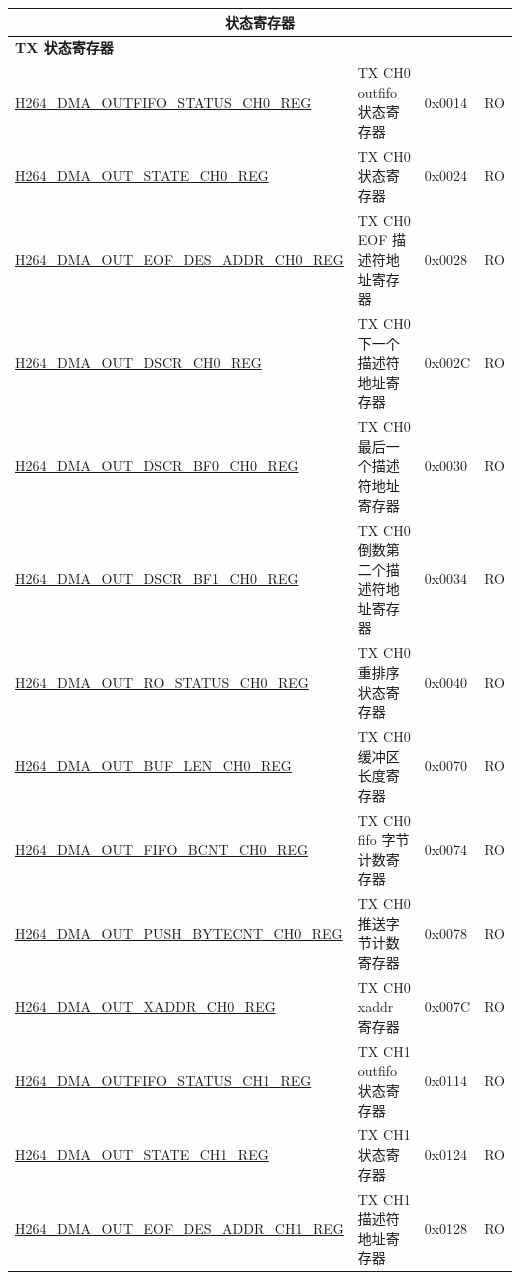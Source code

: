 \begin{longtable}{ | p{7.5cm} | p{5.7cm} | p{1.2cm} | p{1cm} | }
\multicolumn{4}{|c|}{\cellcolor{gray!15}\textbf{状态寄存器}} \\ \hline
\multicolumn{4}{|l|}{\textbf{TX 状态寄存器}} \\ \hline
    \hyperref[regdesc:H264DMAOUTFIFOSTATUSCH0REG]{H264\_DMA\_OUTFIFO\_STATUS\_CH0\_REG} & TX CH0 outfifo 状态寄存器 & 0x0014 & RO \\ \hline
    \hyperref[regdesc:H264DMAOUTSTATECH0REG]{H264\_DMA\_OUT\_STATE\_CH0\_REG} & TX CH0 状态寄存器 & 0x0024 & RO \\ \hline
    \hyperref[regdesc:H264DMAOUTEOFDESADDRCH0REG]{H264\_DMA\_OUT\_EOF\_DES\_ADDR\_CH0\_REG} & TX CH0 EOF 描述符地址寄存器 & 0x0028 & RO \\ \hline
    \hyperref[regdesc:H264DMAOUTDSCRCH0REG]{H264\_DMA\_OUT\_DSCR\_CH0\_REG} & TX CH0 下一个描述符地址寄存器 & 0x002C & RO \\ \hline
    \hyperref[regdesc:H264DMAOUTDSCRBF0CH0REG]{H264\_DMA\_OUT\_DSCR\_BF0\_CH0\_REG} & TX CH0 最后一个描述符地址寄存器 & 0x0030 & RO \\ \hline
    \hyperref[regdesc:H264DMAOUTDSCRBF1CH0REG]{H264\_DMA\_OUT\_DSCR\_BF1\_CH0\_REG} & TX CH0 倒数第二个描述符地址寄存器 & 0x0034 & RO \\ \hline
    \hyperref[regdesc:H264DMAOUTROSTATUSCH0REG]{H264\_DMA\_OUT\_RO\_STATUS\_CH0\_REG} & TX CH0 重排序状态寄存器 & 0x0040 & RO \\ \hline
    \hyperref[regdesc:H264DMAOUTBUFLENCH0REG]{H264\_DMA\_OUT\_BUF\_LEN\_CH0\_REG} & TX CH0 缓冲区长度寄存器 & 0x0070 & RO \\ \hline
    \hyperref[regdesc:H264DMAOUTFIFOBCNTCH0REG]{H264\_DMA\_OUT\_FIFO\_BCNT\_CH0\_REG} & TX CH0 fifo 字节计数寄存器 & 0x0074 & RO \\ \hline
    \hyperref[regdesc:H264DMAOUTPUSHBYTECNTCH0REG]{H264\_DMA\_OUT\_PUSH\_BYTECNT\_CH0\_REG} & TX CH0 推送字节计数寄存器 & 0x0078 & RO \\ \hline
    \hyperref[regdesc:H264DMAOUTXADDRCH0REG]{H264\_DMA\_OUT\_XADDR\_CH0\_REG} & TX CH0 xaddr 寄存器 & 0x007C & RO \\ \hline
    \hyperref[regdesc:H264DMAOUTFIFOSTATUSCH1REG]{H264\_DMA\_OUTFIFO\_STATUS\_CH1\_REG} & TX CH1 outfifo 状态寄存器 & 0x0114 & RO \\ \hline
    \hyperref[regdesc:H264DMAOUTSTATECH1REG]{H264\_DMA\_OUT\_STATE\_CH1\_REG} & TX CH1 状态寄存器 & 0x0124 & RO \\ \hline
    \hyperref[regdesc:H264DMAOUTEOFDESADDRCH1REG]{H264\_DMA\_OUT\_EOF\_DES\_ADDR\_CH1\_REG} & TX CH1 描述符地址寄存器 & 0x0128 & RO \\ \hline

\end{longtable}
